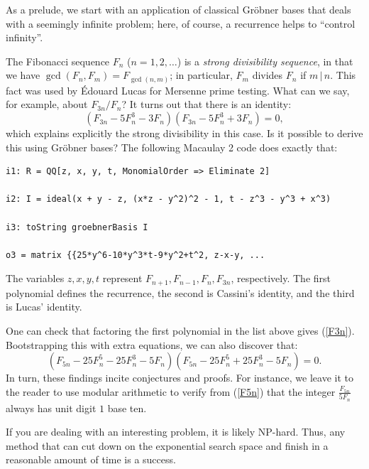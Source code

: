 As a prelude, we start with an application of classical Gr\"obner bases that deals with a seemingly infinite problem; here, of course, a recurrence helps to ``control infinity''.  

The Fibonacci sequence $F_n$ ($n= 1, 2, \ldots$) is a \textit{strong divisibility sequence}, in that we have $\gcd(F_n, F_m) = F_{\gcd(n,m)}$; in particular, $F_m$ divides $F_n$ if $m \, | \, n$.  This fact was used by \'Edouard Lucas for Mersenne prime testing.  What can we say, for example, about $F_{3n}/F_n$?  It turns out that there is an identity:
\begin{equation}\label{F3n}
(F_{3n} - 5 F_n^3 - 3 F_n)(F_{3n} - 5 F_n^3 + 3 F_n) = 0,
\end{equation}
which explains explicitly the strong divisibility in this case.   Is it possible to derive this using Gr\"obner bases?  The following Macaulay 2 code does exactly that:
\begin{M2}
\begin{verbatim}
i1: R = QQ[z, x, y, t, MonomialOrder => Eliminate 2]

i2: I = ideal(x + y - z, (x*z - y^2)^2 - 1, t - z^3 - y^3 + x^3)

i3: toString groebnerBasis I

o3 = matrix {{25*y^6-10*y^3*t-9*y^2+t^2, z-x-y, ...
\end{verbatim}
\end{M2}  
The variables $z,x,y,t$ represent $F_{n+1}, F_{n-1}, F_n, F_{3n}$, respectively.  The first polynomial defines the recurrence, the second is Cassini's identity, and the third is Lucas' identity.

One can check that factoring the first polynomial in the list above gives (\ref{F3n}).  Bootstrapping this with extra equations, we can also discover that:
\begin{equation}\label{F5n}
(F_{5n} - 25 F_n^5 - 25 F_n^3 - 5 F_n)(F_{5n} - 25 F_n^5 + 25 F_n^3 - 5 F_n) = 0.
\end{equation}
In turn, these findings incite conjectures and proofs.  
For instance, we leave it to the reader to use modular arithmetic to verify from (\ref{F5n}) that the integer $\frac{F_{5n}}{5F_n}$ always has unit digit $1$ base ten.  

\iffalse
If you are dealing with an interesting problem, it is likely NP-hard.  Thus, any method that can cut down on the exponential search space and finish in a reasonable amount of time is a success.  

